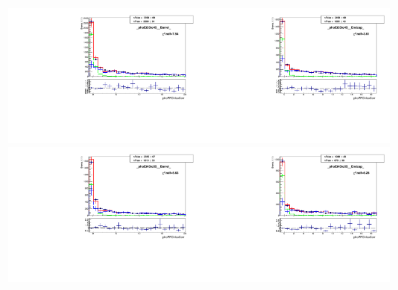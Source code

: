 \begin{figure}[htb]
  \begin{center}
   \includegraphics[width=0.45\textwidth]{../figs/figs_v11/ELECTRON_WGamma/TemplateFits/c_TEMPL_CHISO_UNblind__phoEt35to45__Barrel__RooFit.pdf}\includegraphics[width=0.45\textwidth]{../figs/figs_v11/ELECTRON_WGamma/TemplateFits/c_TEMPL_CHISO_UNblind__phoEt35to45__Endcap__RooFit.pdf}\\
   \includegraphics[width=0.45\textwidth]{../figs/figs_v11/ELECTRON_WGamma/TemplateFits/c_TEMPL_CHISO_UNblind__phoEt45to55__Barrel__RooFit.pdf}\includegraphics[width=0.45\textwidth]{../figs/figs_v11/ELECTRON_WGamma/TemplateFits/c_TEMPL_CHISO_UNblind__phoEt45to55__Endcap__RooFit.pdf}\\

\end{center}
\end{figure}
